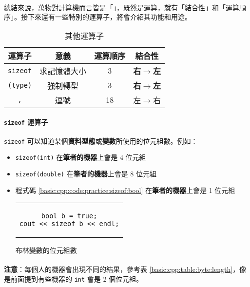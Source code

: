 \documentclass[12pt,a4paper,oneside]{report}
\begin{document}
\begin{CJK}{UTF8}{bkai}
\paragraph{}總結來說，萬物對計算機而言皆是「」，既然是運算，就有「結合性」和「運算順序」。接下來還有一些特別的運算子，將會介紹其功能和用途。

\begin{table}[h!]
\centering
\begin{tabular}{|c|c|c|c|}
\hline
運算子 & 意義 & 運算順序 & 結合性\\
\hline
\hline
\lstinline!sizeof! & 求記憶體大小 & 3 & \textbf{右$\rightarrow$左}\\
\hline
\lstinline!(type)! & 強制轉型    & 3 & \textbf{右$\rightarrow$左}\\
\hline
\lstinline!,!      & 逗號       & 18 & 左$\rightarrow$右\\
\hline
\end{tabular}
\caption{其他運算子}
\label{basic:cpp:table:operator:others}
\end{table}


\paragraph{\lstinline!sizeof! 運算子}\lstinline!sizeof! 可以知道某個\textbf{資料型態}或\textbf{變數}所使用的位元組數。例如：

\begin{itemize}
\item \lstinline!sizeof(int)! 在\textbf{筆者的機器}上會是 4 位元組
\item \lstinline!sizeof(double)! 在\textbf{筆者的機器}上會是 8 位元組
\item 程式碼 \ref{basic:cpp:code:practice:sizeof:bool} 在\textbf{筆者的機器}上會是 1 位元組

\begin{code}[h!]
\centering
\begin{tabular}{c}
\begin{lstlisting}
bool b = true;
cout << sizeof b << endl;
\end{lstlisting}
\end{tabular}
\caption{布林變數的位元組數}
\label{basic:cpp:code:practice:sizeof:bool}
\end{code}
\end{itemize}

\paragraph{}\textbf{注意}：每個人的機器會出現不同的結果，參考表 \ref{basic:cpp:table:byte:length}，像是前面提到有些機器的 \lstinline!int! 會是 2 個位元組。


\end{CJK}
\end{document}
